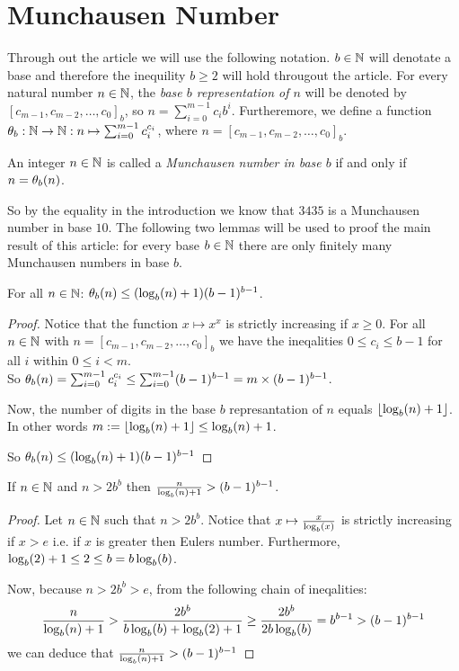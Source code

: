 \section*{Munchausen Number}
Through out the article we will use the following notation. $b \in \N$ will 
denotate a base and therefore the inequility $b \ge 2$ will hold througout the
article. For every natural number $n \in \N$, the \emph{base $b$ representation
of $n$} will be denoted by $[c_{m-1}, c_{m-2}, \ldots, c_{0}]_{b}$, 
so $n = \sum_{i=0}^{m-1} c_{i}b^{i}$.
Furtheremore, we define a function $\P_{b} : \N \rightarrow \N : n \mapsto 
\sum_{i=0}^{m-1} c_{i}^{c_{i}}$, where $n = [c_{m-1},c_{m-2},\ldots,c_{0}]_{b}$.

\begin{definition}
	An integer $n \in \N$ is called a \emph{Munchausen number in base $b$} if 
	and only if $n = \P_{b}(n)$.
\end{definition}

So by the equality in the introduction we know that $3435$ is a Munchausen
number in base $10$. The following two lemmas will be used to proof the main 
result of this article: for every base $b \in \N$ there are only finitely many 
Munchausen numbers in base $b$.

\begin{lemma}
	For all $n \in \N$: $\P_{b}(n) \le (\blog(n) + 1)(b-1)^{b-1}$.
\end{lemma}

\begin{proof}
	Notice that the function $x \mapsto x^{x}$ is strictly increasing if 
	$x \ge 0$. For all $n \in \N$ with 
	$n = [c_{m-1}, c_{m-2}, \ldots, c_{0}]_{b}$ we have the ineqalities 
	$0 \le c_{i} \le b-1$ for all $i$ within $0 \le i < m$.	\\
	So $\P_{b}(n) = \sum_{i=0}^{m-1} c_{i}^{c_{i}} \le 
	\sum_{i=0}^{m-1} (b-1)^{b-1} = m \times (b-1)^{b-1}$.
	
	Now, the number of digits in the base $b$ represantation of $n$ equals 
	$\floor{\blog(n) + 1}$. In other words $m := \floor{\blog(n) + 1} 
	\le \blog(n) + 1$.
	
	So $\P_{b}(n) \le (\blog(n) + 1)(b-1)^{b-1}$
\end{proof}

\begin{lemma}
	If $n \in \N$ and $n > 2b^{b}$ then $\frac{n}{\blog(n) + 1}	> (b-1)^{b-1}$.
\end{lemma}

\begin{proof}
	Let $n \in \N$ such that $n > 2b^{b}$. Notice that 
	$x \mapsto \frac{x}{\blog(x)}$ is strictly increasing if $x > e$ i.e. if $x$
	is greater then Eulers number. Furthermore, $\blog(2) + 1 \le 2 \le b = 
	b\blog(b)$. 
	
	Now, because $n > 2b^{b} > e$, from the following chain of ineqalities:
	\[
		\frac{n}{\blog(n) + 1} > \frac{2b^{b}}{b\blog(b) + \blog(2) + 1} \ge 
		\frac{2b^{b}}{2b\blog(b)} = b^{b-1} > (b-1)^{b-1}
	\]
	we can deduce that $\frac{n}{\blog(n) + 1} > (b-1)^{b-1}$
\end{proof}

